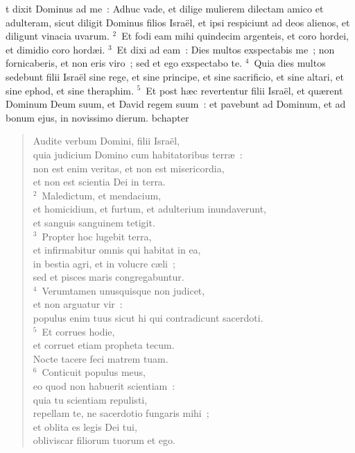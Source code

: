 \bchapter
{}t dixit Dominus ad me~: Adhuc vade, et dilige mulierem dilectam amico et adulteram, sicut diligit Dominus filios Isra\"el, et ipsi respiciunt ad deos alienos, et diligunt vinacia uvarum.
${}^{2}$~Et fodi eam mihi quindecim argenteis, et coro hordei, et dimidio coro hord\ae i.
${}^{3}$~Et dixi ad eam~: Dies multos exspectabis me~; non fornicaberis, et non eris viro~; sed et ego exspectabo te.
${}^{4}$~Quia dies multos sedebunt filii Isra\"el sine rege, et sine principe, et sine sacrificio, et sine altari, et sine ephod, et sine theraphim.
${}^{5}$~Et post h\ae c revertentur filii Isra\"el, et qu\ae rent Dominum Deum suum, et David regem suum~: et pavebunt ad Dominum, et ad bonum ejus, in novissimo dierum.
bchapter\begin{flushleft}\begin{verse}\vspace{-19pt}Audite verbum Domini, filii Isra\"el,\\ quia judicium Domino cum habitatoribus terr\ae~:\\ non est enim veritas, et non est misericordia,\\ et non est scientia Dei in terra.\\
${}^{2}$~Maledictum, et mendacium,\\ et homicidium, et furtum, et adulterium inundaverunt,\\ et sanguis sanguinem tetigit.\\
${}^{3}$~Propter hoc lugebit terra,\\ et infirmabitur omnis qui habitat in ea,\\ in bestia agri, et in volucre c\ae li~;\\ sed et pisces maris congregabuntur.\\
${}^{4}$~Verumtamen unusquisque non judicet,\\ et non arguatur vir~:\\ populus enim tuus sicut hi qui contradicunt sacerdoti.\\
${}^{5}$~Et corrues hodie,\\ et corruet etiam propheta tecum.\\ Nocte tacere feci matrem tuam.\\
${}^{6}$~Conticuit populus meus,\\ eo quod non habuerit scientiam~:\\ quia tu scientiam repulisti,\\ repellam te, ne sacerdotio fungaris mihi~;\\ et oblita es legis Dei tui,\\ obliviscar filiorum tuorum et ego.\\

\end{verse}
\end{flushleft}
